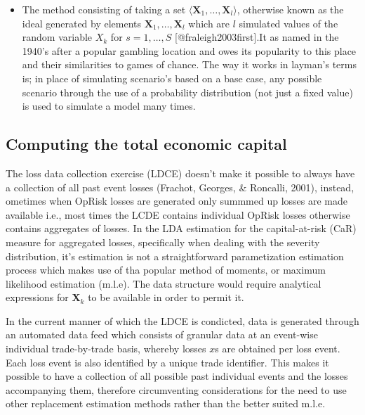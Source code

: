\documentclass{DissertateUSU}
\begin{document}
\begin{itemize}
\item The method consisting of taking a set \begin{math} \langle \mathbf{X}_1, \ldots , \mathbf{X}_l \rangle \end{math}, otherwise known as the ideal generated by elements \begin{math} \mathbf{X}_1, \ldots , \mathbf{X}_l \end{math} which are $l$ simulated values of the random variable $X_{k}$  for $s = 1,\ldots, S$ [@fraleigh2003first].It as named in the 1940's after a popular gambling location and owes its popularity to this place and their similarities to games of chance. The way it works in layman's terms is; in place of simulating scenario's based on a base case, any possible scenario through the use of a probability distribution (not just a fixed value) is used to simulate a model many times.
\end{itemize}

\subsection{Computing the total economic capital}

The loss data collection exercise (LDCE) doesn't make it possible to
always have a collection of all past event losses (Frachot, Georges, \&
Roncalli, 2001), instead, ometimes when OpRisk losses are generated only
summmed up losses are made available i.e., most times the LCDE contains
individual OpRisk losses otherwise contains aggregates of losses. In the
LDA estimation for the capital-at-risk (CaR) measure for aggregated
losses, specifically when dealing with the severity distribution, it's
estimation is not a straightforward parametization estimation process
which makes use of tha popular method of moments, or maximum likelihood
estimation (m.l.e). The data structure would require analytical
expressions for \(\mathbf{X}_k\) to be available in order to permit
it.\medskip

In the current manner of which the LDCE is condicted, data is generated
through an automated data feed which consists of granular data at an
event-wise individual trade-by-trade basis, whereby losses \(x\)s are
obtained per loss event. Each loss event is also identified by a unique
trade identifier. This makes it possible to have a collection of all
possible past individual events and the losses accompanying them,
therefore circumventing considerations for the need to use other
replacement estimation methods rather than the better suited
m.l.e.\medskip
\end{document}

